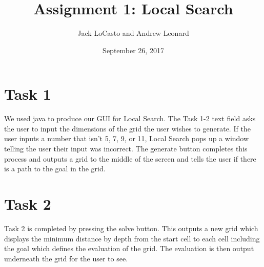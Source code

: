 \documentclass[11pt, oneside]{article}   	%
\title{Assignment 1: Local Search}
\author{Jack LoCasto and Andrew Leonard}
\date{September 26, 2017}							%
\begin{document}
\maketitle

\section{Task 1}
We used java to produce our GUI for Local Search. The Task 1-2 text field asks the user to input the dimensions of the grid the user wishes to generate. If the user inputs a number that isn't 5, 7, 9, or 11, Local Search pops up a window telling the user their input was incorrect. The generate button completes this process and outputs a grid to the middle of the screen and tells the user if there is a path to the goal in the grid.

\section{Task 2}
Task 2 is completed by pressing the solve button. This outputs a new grid which displays the minimum distance by depth from the start cell to each cell including the goal which defines the evaluation of the grid. The evaluation is then output underneath the grid for the user to see.
\end{document}

